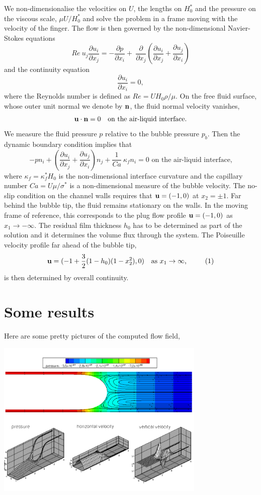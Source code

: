 We non-\/dimensionalise the velocities on $ U $, the lengths on $ H_0^* $ and the pressure on the viscous scale, $ \mu U / H_0^* $ and solve the problem in a frame moving with the velocity of the finger. The flow is then governed by the non-\/dimensional Navier-\/\+Stokes equations \[ Re \ u_j\frac{\partial u_i}{\partial x_j} = -\frac{\partial p}{\partial x_i} + \ \frac{\partial }{\partial x_j }\left( \frac{\partial u_i}{\partial x_j} + \frac{\partial u_j}{\partial x_i} \right) \] and the continuity equation \[ \frac{\partial u_i}{\partial x_i}=0, \] where the Reynolds number is defined as $ Re=U H_0 \rho/\mu $. On the free fluid surface, whose outer unit normal we denote by $ {\bf n} $, the fluid normal velocity vanishes, \[ {\bf u} \cdot {\bf n} = 0 \mbox{\ \ \ on the air-liquid interface}. \] We measure the fluid pressure $ p $ relative to the bubble pressure $ p_b $. Then the dynamic boundary condition implies that \[ -p n_i + \left( \frac{\partial u_i}{\partial x_j} + \frac{\partial u_j}{\partial x_i} \right) n_j + \frac{1}{Ca} \ \kappa_f n_i = 0 \mbox{\ \ \ on the air-liquid interface,} \] where $ \kappa_f = \kappa_f^* H_0 $ is the non-\/dimensional interface curvature and the capillary number $ Ca = U\mu/\sigma^* $ is a non-\/dimensional measure of the bubble velocity. The no-\/slip condition on the channel walls requires that $ {\bf u}=(-1,0) $ at $ x_2=\pm 1 $. Far behind the bubble tip, the fluid remains stationary on the walls. In the moving frame of reference, this corresponds to the plug flow profile $ {\bf u}=(-1,0) $ as $ x_1\to -\infty $. The residual film thickness $ h_0 $ has to be determined as part of the solution and it determines the volume flux through the system. The Poiseuille velocity profile far ahead of the bubble tip, \[ {\bf u}=(-1+\frac{3}{2}(1-h_0)(1-x_2^2),0) \mbox{\ \ \ as $ x_1\to \infty$,} \ \ \ \ \ \ \ \ (1) \] is then determined by overall continuity.



 

\hypertarget{index_results}{}\section{Some results}\label{index_results}
Here are some pretty pictures of the computed flow field,

 
\begin{DoxyImage}
\includegraphics[width=0.75\textwidth]{bretherton_flow_with_streamlines}
\end{DoxyImage}


